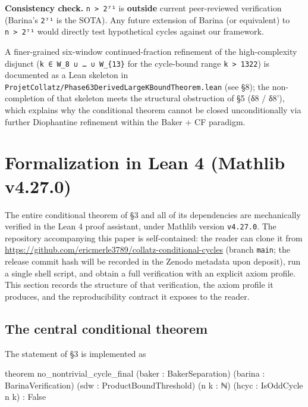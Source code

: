 \documentclass[
  11pt]{amsart}
\newenvironment{Shaded}{}{}
\newcommand{\NormalTok}[1]{#1}
\theoremstyle{plain}
\theoremstyle{definition}
\theoremstyle{remark}
\begin{document}
\textbf{Consistency check.} \texttt{n\ \textgreater{}\ 2⁷¹} is
\textbf{outside} current peer-reviewed verification (Barina's
\texttt{2⁷¹} is the SOTA). Any future extension of Barina (or
equivalent) to \texttt{n\ \textgreater{}\ 2⁷¹} would directly test
hypothetical cycles against our framework.

A finer-grained six-window continued-fraction refinement of the
high-complexity disjunct (\texttt{k\ ∈\ W\_8\ ∪\ …\ ∪\ W\_\{13\}} for
the cycle-bound range \texttt{k\ \textgreater{}\ 1322}) is documented as
a Lean skeleton in
\texttt{ProjetCollatz/Phase63DerivedLargeKBoundTheorem.lean} (see §8);
the non-completion of that skeleton meets the structural obstruction of
§5 (δ8 / δ8'), which explains why the conditional theorem cannot be
closed unconditionally via further Diophantine refinement within the
Baker + CF paradigm.

\section{Formalization in Lean 4 (Mathlib
v4.27.0)}\label{formalization-in-lean-4-mathlib-v4.27.0}

The entire conditional theorem of §3 and all of its dependencies are
mechanically verified in the Lean 4 proof assistant, under Mathlib
version \texttt{v4.27.0}. The repository accompanying this paper is
self-contained: the reader can clone it from
\url{https://github.com/ericmerle3789/collatz-conditional-cycles}
(branch \texttt{main}; the release commit hash will be recorded in the
Zenodo metadata upon deposit), run a single shell script, and obtain a
full verification with an explicit axiom profile. This section records
the structure of that verification, the axiom profile it produces, and
the reproducibility contract it exposes to the reader.

\subsection{The central conditional
theorem}\label{the-central-conditional-theorem}

The statement of §3 is implemented as

\begin{Shaded}
\begin{Highlighting}[]
\NormalTok{theorem no\_nontrivial\_cycle\_final}
\NormalTok{    (baker : BakerSeparation) (barina : BarinaVerification)}
\NormalTok{    (sdw : ProductBoundThreshold)}
\NormalTok{    (n k : ℕ) (hcyc : IsOddCycle n k) : False}
\end{Highlighting}
\end{Shaded}
\end{document}
